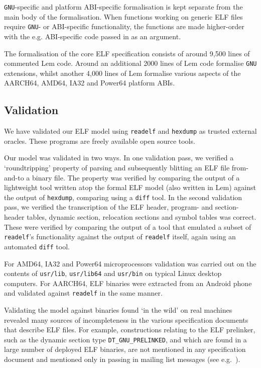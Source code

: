 \texttt{GNU}-specific and platform ABI-specific formalisation is kept separate from the main body of the formalisation.
When functions working on generic ELF files require \texttt{GNU}- or ABI-specific functionality, the functions are made higher-order with the e.g. ABI-specific code passed in as an argument.

The formalisation of the core ELF specification consists of around 9,500 lines of commented Lem code.
Around an additional 2000 lines of Lem code formalise \texttt{GNU} extensions, whilst another 4,000 lines of Lem formalise various aspects of the AARCH64, AMD64, IA32 and Power64 platform ABIs.

\subsection{Validation}
\label{subsect.elf.validation}

We have validated our ELF model using \texttt{readelf} and \texttt{hexdump} as trusted external oracles.
These programs are freely available open source tools.

Our model was validated in two ways.
In one validation pass, we verified a `roundtripping' property of parsing and subsequently blitting an ELF file from-and-to a binary file.
The property was verified by comparing the output of a lightweight tool written atop the formal ELF model (also written in Lem) against the output of \texttt{hexdump}, comparing using a \texttt{diff} tool.
In the second validation pass, we verified the transcription of the ELF header, program- and section-header tables, dynamic section, relocation sections and symbol tables was correct.
These were verified by comparing the output of a tool that emulated a subset of \texttt{readelf}'s functionality against the output of \texttt{readelf} itself, again using an automated \texttt{diff} tool.

For AMD64, IA32 and Power64 microprocessors validation was carried out on the contents of \texttt{usr/lib}, \texttt{usr/lib64} and \texttt{usr/bin} on typical Linux desktop computers.
For AARCH64, ELF binaries were extracted from an Android phone and validated against \texttt{readelf} in the same manner.

Validating the model against binaries found `in the wild' on real machines revealed many sources of incompleteness in the various specification documents that describe ELF files.
For example, constructions relating to the ELF prelinker, such as the dynamic section type \texttt{DT\_GNU\_PRELINKED}, and which are found in a large number of deployed ELF binaries, are not mentioned in any specification document and mentioned only in passing in mailing list messages (see e.g.~\cite{jelinek-prelinker-2001}).

